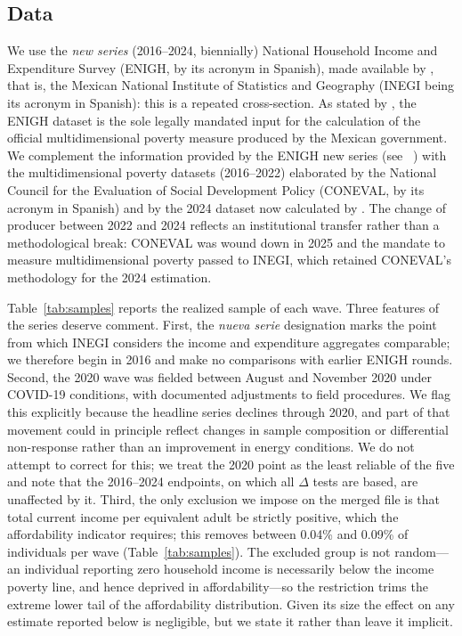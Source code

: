\documentclass[11pt, a4paper]{article}
\newcommand{\citealp}[1]{\citeauthor{#1}~\citeyear{#1}}
\begin{document}
\subsection{Data}

We use the \textit{new series} (2016--2024, biennially) National Household Income and Expenditure Survey (ENIGH, by its acronym in Spanish), made available by \textcite{enigh2016, enigh2018, enigh2020, enigh2022, enigh2024}, that is, the Mexican National Institute of Statistics and Geography (INEGI being its acronym in Spanish): this is a repeated cross-section. As stated by \textcite{coneval2019}, the ENIGH dataset is the sole legally mandated input for the calculation of the official multidimensional poverty measure produced by the Mexican government. We complement the information provided by the ENIGH new series (see \citealp{inegi2023}) with the multidimensional poverty datasets (2016--2022) elaborated by the National Council for the Evaluation of Social Development Policy (CONEVAL, by its acronym in Spanish) \parencite{coneval_data} and by the 2024 dataset now calculated by \textcite{pm_inegi_2025}. The change of producer between 2022 and 2024 reflects an institutional transfer rather than a methodological break: CONEVAL was wound down in 2025 and the mandate to measure multidimensional poverty passed to INEGI, which retained CONEVAL's methodology for the 2024 estimation.

Table~\ref{tab:samples} reports the realized sample of each wave. Three features of the series deserve comment. First, the \textit{nueva serie} designation \parencite{inegi2023} marks the point from which INEGI considers the income and expenditure aggregates comparable; we therefore begin in 2016 and make no comparisons with earlier ENIGH rounds. Second, the 2020 wave was fielded between August and November 2020 under COVID-19 conditions, with documented adjustments to field procedures. We flag this explicitly because the headline series declines through 2020, and part of that movement could in principle reflect changes in sample composition or differential non-response rather than an improvement in energy conditions. We do not attempt to correct for this; we treat the 2020 point as the least reliable of the five and note that the 2016--2024 endpoints, on which all $\Delta$ tests are based, are unaffected by it. Third, the only exclusion we impose on the merged file is that total current income per equivalent adult be strictly positive, which the affordability indicator requires; this removes between 0.04\% and 0.09\% of individuals per wave (Table~\ref{tab:samples}). The excluded group is not random---an individual reporting zero household income is necessarily below the income poverty line, and hence deprived in affordability---so the restriction trims the extreme lower tail of the affordability distribution. Given its size the effect on any estimate reported below is negligible, but we state it rather than leave it implicit.
\end{document}
